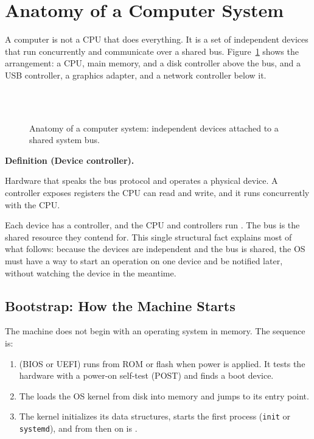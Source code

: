 \documentclass[11pt]{article}
\newenvironment{definitionbox}[1]{%
  \par\noindent\textbf{Definition (#1).}\ \itshape
}{\par\vspace{0.3em}}
\begin{document}
\section{Anatomy of a Computer System}

A computer is not a CPU that does everything. It is a set of independent devices that run concurrently and communicate over a shared bus. Figure~\ref{fig:anatomy} shows the arrangement: a CPU, main memory, and a disk controller above the bus, and a USB controller, a graphics adapter, and a network controller below it.

\begin{figure}[ht]
\centering
\small
{}\hfill
{}\hfill
{}\\[0.3em]
\\[0.3em]
\hfill
{}\hfill
{}
\caption{Anatomy of a computer system: independent devices attached to a shared system bus.}
\label{fig:anatomy}
\end{figure}

\begin{definitionbox}{Device controller}
Hardware that speaks the bus protocol and operates a physical device. A controller exposes registers the CPU can read and write, and it runs concurrently with the CPU.
\end{definitionbox}

Each device has a controller, and the CPU and controllers run . The bus is the shared resource they contend for. This single structural fact explains most of what follows: because the devices are independent and the bus is shared, the OS must have a way to start an operation on one device and be notified later, without watching the device in the meantime.

\subsection{Bootstrap: How the Machine Starts}

The machine does not begin with an operating system in memory. The sequence is:

\begin{enumerate}
  \item {} (BIOS or UEFI) runs from ROM or flash when power is applied. It tests the hardware with a power-on self-test (POST) and finds a boot device.
  \item The  loads the OS kernel from disk into memory and jumps to its entry point.
  \item The kernel initializes its data structures, starts the first process (\texttt{init} or \texttt{systemd}), and from then on is .
\end{enumerate}
\end{document}
